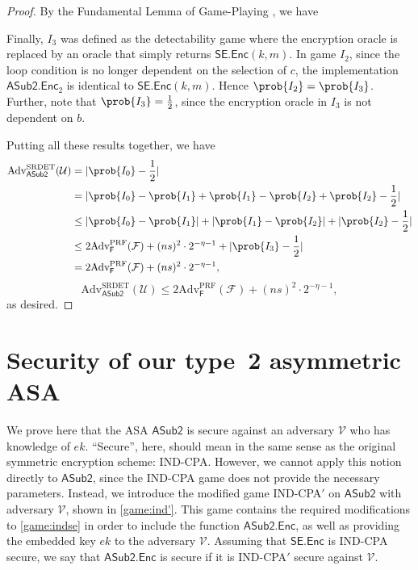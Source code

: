 \begin{proof}
By the Fundamental Lemma of Game-Playing \cite{EC:BelRog06}, we have

Finally, $I_3$ was defined as the detectability game where the encryption oracle is replaced by an oracle that simply returns $\mathsf{SE.Enc}(k,m)$. In game $I_2$, since the loop condition is no longer dependent on the selection of $c$, the implementation $\mathsf{ASub2.Enc}_2$ is identical to $\mathsf{SE.Enc}(k,m)$. Hence $\prob{I_2}=\prob{I_3}$. Further, note that $\prob{I_3}=\frac{1}{2}$, since the encryption oracle in $I_3$ is not dependent on $b$.

Putting all these results together, we have
\iffullversion
\begin{align*}
\text{Adv}^\text{SRDET}_\mathsf{ASub2}(\mathcal{U})
&= |\prob{I_0}-\frac{1}{2}| \\
&= |\prob{I_0}-\prob{I_1}+\prob{I_1}-\prob{I_2}+\prob{I_2}-\frac{1}{2}| \\
&\le |\prob{I_0}-\prob{I_1}|+|\prob{I_1}-\prob{I_2}|+|\prob{I_2}-\frac{1}{2}| \\
&\le 2\text{Adv}^{\text{PRF}}_\mathsf{F}(\mathcal{F}) + (ns)^2\cdot 2^{-\eta-1} + |\prob{I_3}-\frac{1}{2}| \\
&= 2\text{Adv}^{\text{PRF}}_\mathsf{F}(\mathcal{F}) + (ns)^2\cdot 2^{-\eta-1},
\end{align*}
\else
\[
\text{Adv}^\text{SRDET}_\mathsf{ASub2}(\mathcal{U}) \le 2\text{Adv}^{\text{PRF}}_\mathsf{F}(\mathcal{F}) + (ns)^2\cdot 2^{-\eta-1},
\]
\fi
as desired.

\end{proof}

\section{Security of our type~2 asymmetric ASA} \label{sec:security}
We prove here that the ASA $\mathsf{ASub2}$ is secure against an adversary $\mathcal{V}$ who has knowledge of $ek$. ``Secure'', here, should mean in the same sense as the original symmetric encryption scheme: IND-CPA. However, we cannot apply this notion directly to $\mathsf{ASub2}$, since the IND-CPA game does not provide the necessary parameters. Instead, we introduce the modified game IND-CPA$'$ on $\mathsf{ASub2}$ with adversary $\mathcal{V}$, shown in \autoref{game:ind'}. This game contains the required modifications to \autoref{game:indse} in order to include the function $\mathsf{ASub2.Enc}$, as well as providing the embedded key $ek$ to the adversary $\mathcal{V}$. Assuming that $\mathsf{SE.Enc}$ is IND-CPA secure, we say that $\mathsf{ASub2.Enc}$ is secure if it is IND-CPA$'$ secure against $\mathcal{V}$.

